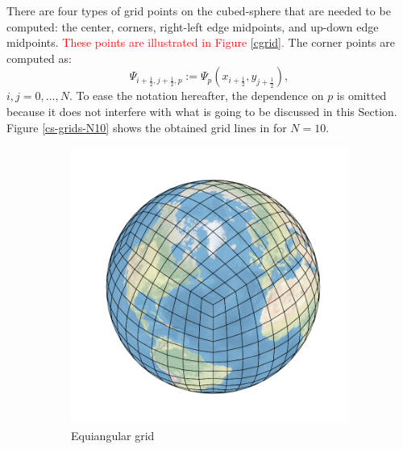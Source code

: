 \documentclass[preprint,12pt]{elsarticle}
\begin{document}
\begin{linenumbers}
There are four types of grid points on the cubed-sphere that are needed to be computed: the center, corners, right-left edge midpoints, and  up-down edge midpoints. 
\textcolor{red}
{These points are illustrated in Figure \ref{cgrid}.}
The corner points are computed as:
\begin{equation}
	\label{corner-points}
	\Psi_{i+\frac{1}{2},j+\frac{1}{2},p} := {\Psi}_p(x_{i+\frac{1}{2}},y_{j+\frac{1}{2}}),
\end{equation}
$i,j=0, \ldots, N$.
To ease the notation hereafter, the dependence on $p$ is omitted because it does not interfere with what is going to be discussed in this Section.
Figure \ref{cs-grids-N10} shows the obtained grid lines in for $N=10$.
\begin{figure}[!htb]
	\begin{subfigure}{0.42\textwidth}
		\centering
		\includegraphics[width=1.1\linewidth]{gnomonic_equiedge_cs_10_sphere}
		\caption{Equiangular grid}
	\end{subfigure}
	\centering
\begin{subfigure}{0.42\textwidth}
	\centering

\end{subfigure}
\end{figure}
\end{linenumbers}
\end{document}
